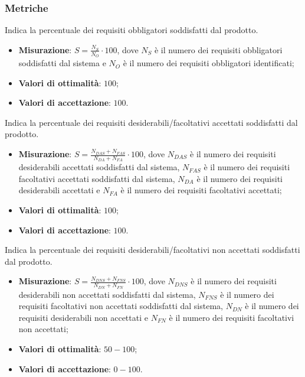 \subsubsection{Metriche}
\label{reqObbSodd}
Indica la percentuale dei requisiti obbligatori soddisfatti dal prodotto.
\begin{itemize}
\item \textbf{Misurazione}: $S=\frac{N_{S}}{N_{O}} \cdot 100$, dove $N_{S}$ è il numero dei requisiti obbligatori soddisfatti dal sistema e $N_{O}$ è il numero dei requisiti obbligatori identificati;
\item \textbf{Valori di ottimalità}: $100$;
\item \textbf{Valori di accettazione}: $100$.
\end{itemize}
\label{reqAccSodd}
Indica la percentuale dei requisiti desiderabili/facoltativi accettati soddisfatti dal prodotto.
\begin{itemize}
\item \textbf{Misurazione}: $S=\frac{N_{DAS}+N_{FAS}}{N_{DA}+N_{FA}} \cdot 100$, dove $N_{DAS}$ è il numero dei requisiti desiderabili accettati soddisfatti dal sistema, $N_{FAS}$ è il numero dei requisiti facoltativi accettati soddisfatti dal sistema, $N_{DA}$ è il numero dei requisiti desiderabili accettati e $N_{FA}$ è il numero dei requisiti facoltativi accettati;
\item \textbf{Valori di ottimalità}: $100$;
\item \textbf{Valori di accettazione}: $100$.
\end{itemize}
\label{reqNonAccSodd}
Indica la percentuale dei requisiti desiderabili/facoltativi non accettati soddisfatti dal prodotto.
\begin{itemize}
\item \textbf{Misurazione}: $S=\frac{N_{DNS}+N_{FNS}}{N_{DN}+N_{FN}} \cdot 100$, dove $N_{DNS}$ è il numero dei requisiti desiderabili non accettati soddisfatti dal sistema, $N_{FNS}$ è il numero dei requisiti facoltativi non accettati soddisfatti dal sistema, $N_{DN}$ è il numero dei requisiti desiderabili non accettati e $N_{FN}$ è il numero dei requisiti facoltativi non accettati;
\item \textbf{Valori di ottimalità}: $50 - 100$;
\item \textbf{Valori di accettazione}: $0 - 100$.
\end{itemize}
